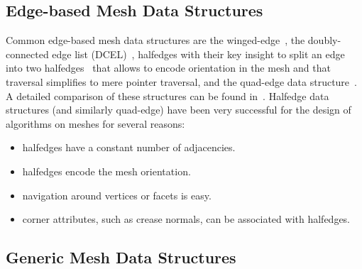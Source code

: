 \subsection{Edge-based Mesh Data Structures}


Common edge-based mesh data structures are the
winged-edge~\cite{Baumgart:1975:PRCV}, the doubly-connected edge list
(DCEL)~\cite{Muller78}, halfedges with their key insight to split an
edge into two halfedges~\cite{Weiler85,Maentylae88} that allows to
encode orientation in the mesh and that traversal simplifies to mere
pointer traversal, and the quad-edge data
structure~\cite{Guibas:1983:PMG}. A detailed comparison of these
structures can be found in~\cite{k-ugpdd-99}.
Halfedge data structures (and similarly quad-edge) have been very
successful for the design of algorithms on meshes for several reasons:
\begin{itemize}
\item halfedges have a constant number of adjacencies. 
\item halfedges encode the mesh orientation.
\item navigation around vertices or facets is easy.
\item corner attributes, such as crease normals, can be associated
      with halfedges.
\end{itemize}


\subsection{Generic Mesh Data Structures}

